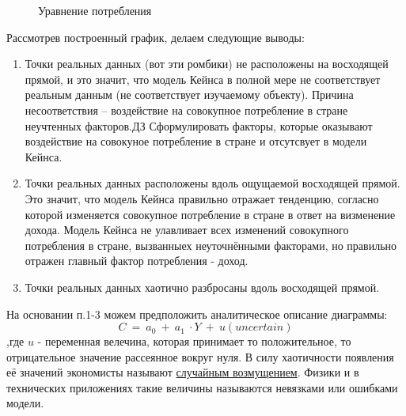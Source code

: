 \documentclass[12pt,a4paper]{article}
\begin{document}
\begin{figure}[H]
\begin{center}
\end{center}
\caption{Уравнение потребления}
\end{figure}

Рассмотрев построенный график, делаем следующие выводы:
\begin{enumerate}
\item Точки реальных данных (вот эти ромбики) не расположены на восходящей прямой, и это значит, что модель Кейнса в полной мере не соответствует реальным данным (не соответствует изучаемому объекту). Причина несоответствия -- воздействие на совокупное потребление в стране неучтенных факторов.$\displaystyle \boxed{\text{ДЗ}}$ Сформулировать факторы, которые оказывают воздействие на совокуное потребление в стране и отсутсвует в модели Кейнса.
\item Точки реальных данных расположены вдоль ощущаемой восходящей прямой. Это значит, что модель Кейнса правильно отражает тенденцию, согласно которой изменяется совокупное потребление в стране в ответ на визменение дохода. Модель Кейнса не улавливает всех изменений совокупного потребления в стране, вызванныех неуточнёнными факторами, но правильно отражен главный фактор потребления - доход.
\item Точки реальных данных хаотично разбросаны вдоль восходящей прямой.
\end{enumerate}

	На основании п.1-3 можем предположить аналитическое описание диаграммы:
\begin{equation}
C\ =\ a_{0} \ +\ a_{1} \ \cdot Y\ +\ u( uncertain)
\end{equation}
,где $\displaystyle u$ - переменная велечина, которая принимает то положительное, то отрицательное значение рассеянное вокруг нуля. В силу хаотичности появления её значений экономисты называют \underline{случайным возмущением}. Физики и в технических приложениях такие величины называются невязками или ошибками модели.
\end{document}
